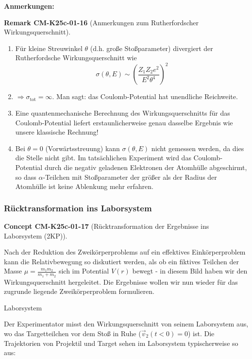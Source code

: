 \documentclass[10pt, letterpaper]{article}
\newcommand{\CustomHeading}[3]{%
  \par\medskip\noindent%
  \textbf{#1 #2} \textnormal{(#3)}.\enskip%
}
\newenvironment{REM}[2]{\begin{unitbox}\CustomHeading{Remark}{#1}{#2}}{\end{unitbox}}
\newenvironment{CONC}[2]{\begin{unitbox}\CustomHeading{Concept}{#1}{#2}}{\end{unitbox}}
\begin{document}
\noindent\textbf{Anmerkungen:}



\begin{REM}{CM-K25c-01-16}{Anmerkungen zum Rutherfordscher Wirkungsquerschnitt}
\begin{enumerate}
\item Für kleine Streuwinkel $\theta$ (d.h. große Stoßparameter) divergiert der Rutherfordsche Wirkungsquerschnitt wie
\[\sigma(\theta,E) \sim \left(\frac{Z_1Z_2e^2}{E^2\theta^4}\right)^2\]

\item $\Rightarrow \sigma_{\text{tot}} = \infty$. Man sagt: das Coulomb-Potential hat unendliche Reichweite.

\item Eine quantenmechanische Berechnung des Wirkungsquerschnitts für das Coulomb-Potential liefert erstaunlicherweise genau dasselbe Ergebnis wie unsere klassische Rechnung!

\item Bei $\theta = 0$ (Vorwärtsstreuung) kann $\sigma(\theta,E)$ nicht gemessen werden, da dies die Stelle nicht gibt. Im tatsächlichen Experiment wird das Coulomb-Potential durch die negativ geladenen Elektronen der Atomhülle abgeschirmt, so dass $\alpha$-Teilchen mit Stoßparameter der größer als der Radius der Atomhülle ist keine Ablenkung mehr erfahren.

\end{enumerate}
\end{REM}


\subsubsection{Rücktransformation ins Laborsystem}


\begin{CONC}{CM-K25c-01-17}{Rücktransformation der Ergebnisse ins Laborsystem (2KP)}
Nach der Reduktion des Zweikörperproblems auf ein effektives Einkörperproblem kann die Relativbewegung so diskutiert werden, als ob ein fiktives Teilchen der Masse $\mu=\frac{m_1m_2}{m_1+m_2}$ sich im Potential $V(r)$ bewegt - in diesem Bild haben wir den Wirkungsquerschnitt hergeleitet. Die Ergebnisse wollen wir nun wieder für das zugrunde liegende Zweikörperproblem formulieren.
\end{CONC}

Laborsystem

Der Experimentator misst den Wirkungsquerschnitt von seinem Laborsystem aus, wo das Targetteilchen vor dem Stoß in Ruhe ($\vec{v}_2(t<0)=0$) ist. Die Trajektorien von Projektil und Target sehen im Laborsystem typischerweise so aus:
\end{document}

